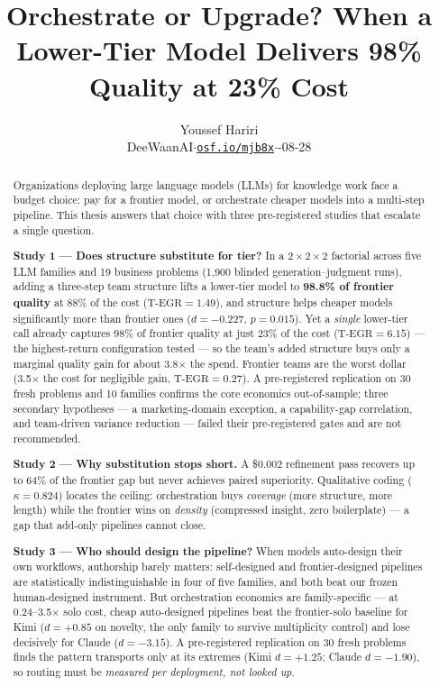 \documentclass[12pt,a4paper]{article}
\title{\textbf{Orchestrate or Upgrade? When a Lower-Tier Model Delivers
98\% Quality at 23\% Cost}}
\author{Youssef Hariri\\
\small DeeWaanAI\quad $\cdot$\quad \href{https://osf.io/mjb8x}{\texttt{osf.io/mjb8x}}\quad $\cdot$\quad 2026-08-28}
\date{}
\newcommand{\TEGR}{\ensuremath{\text{T-EGR}}}
\begin{document}
\maketitle

\begin{abstract}
\noindent
Organizations deploying large language models (LLMs) for knowledge work face a
budget choice: pay for a frontier model, or orchestrate cheaper models into a
multi-step pipeline. This thesis answers that choice with three pre-registered
studies that escalate a single question.

\smallskip
\noindent\textbf{Study 1 --- Does structure substitute for tier?} In a
$2 \times 2 \times 2$ factorial across five LLM families and 19 business
problems (1{,}900 blinded generation--judgment runs), adding a three-step team
structure lifts a lower-tier model to \textbf{98.8\% of frontier quality} at
88\% of the cost ($\TEGR = 1.49$), and structure helps cheaper models
significantly more than frontier ones ($d = -0.227$, $p = 0.015$). Yet a
\emph{single} lower-tier call already captures 98\% of frontier quality at just
23\% of the cost ($\TEGR = 6.15$) --- the highest-return configuration tested ---
so the team's added structure buys only a marginal quality gain for about
3.8$\times$ the spend. Frontier teams are the worst dollar (3.5$\times$ the cost
for negligible gain, $\TEGR = 0.27$). A pre-registered replication on 30 fresh problems and 10 families confirms the core economics out-of-sample; three secondary hypotheses --- a marketing-domain exception, a capability-gap correlation, and team-driven variance reduction --- failed their pre-registered gates and are not recommended.

\smallskip
\noindent\textbf{Study 2 --- Why substitution stops short.} A \$0.002
refinement pass recovers up to 64\% of the frontier gap but never achieves
paired superiority. Qualitative coding ($\kappa = 0.824$) locates the ceiling:
orchestration buys \emph{coverage} (more structure, more length) while the
frontier wins on \emph{density} (compressed insight, zero boilerplate) --- a gap
that add-only pipelines cannot close.

\smallskip
\noindent\textbf{Study 3 --- Who should design the pipeline?} When models
auto-design their own workflows, authorship barely matters: self-designed and
frontier-designed pipelines are statistically indistinguishable in four of five
families, and both beat our frozen human-designed instrument. But orchestration
economics are family-specific --- at 0.24--3.5$\times$ solo cost, cheap
auto-designed pipelines beat the frontier-solo baseline for Kimi ($d = +0.85$ on
novelty, the only family to survive multiplicity control) and lose decisively for
Claude ($d = -3.15$). A pre-registered replication on 30 fresh problems finds the
pattern transports only at its extremes (Kimi $d = +1.25$; Claude $d = -1.90$),
so routing must be \emph{measured per deployment, not looked up}.


\end{abstract}
\end{document}
